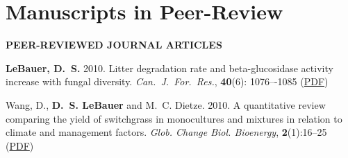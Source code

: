 \documentclass[12pt,twoside]{article}
\begin{document}
{{\section{Manuscripts in Peer-Review}\label{sxn:mpr}


\tableofcontents
} %


\textbf{PEER-REVIEWED JOURNAL ARTICLES}
\begin{itemize*}


\item \noindent%
\textbf{LeBauer, D.~S.} 2010. Litter degradation rate and beta-glucosidase activity increase with fungal diversity. \textit{Can.\ J.\ For.\ Res.}, \textbf{40}(6): 1076–-1085
\ifpdf %
(\href{https://netfiles.uiuc.edu/dlebauer/www/lebauer2010ldr.pdf}{PDF})
\fi %

\item \noindent%
Wang, D., \textbf{D.~S. LeBauer} and M.~C. Dietze. 2010. A quantitative review comparing the yield of
switchgrass in monocultures and mixtures in relation to climate and management factors. \textit{Glob.
Change Biol. Bioenergy}, \textbf{2}(1):16--25
\ifpdf %
(\href{https://netfiles.uiuc.edu/dlebauer/www/wang2010qrc.pdf}{PDF})
\fi %


\end{itemize*}}
\end{document}
